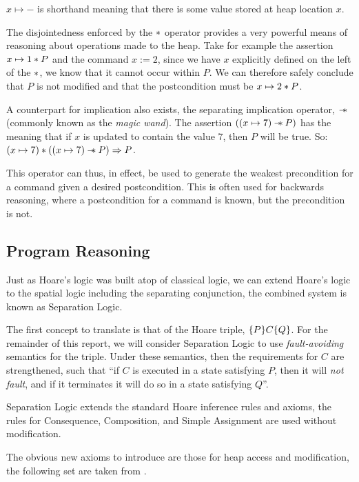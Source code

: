 \documentclass[a4paper,notitlepage]{report}
\begin{document}

  $x \mapsto -$ is shorthand meaning that there is some value stored at heap
  location $x$.

  The disjointedness enforced by the $\mathbin{*}$ operator provides a very powerful
  means of reasoning about operations made to the heap. Take for example the
  assertion $x \mapsto 1 \mathbin{*} P$ and the command $x := 2$, since we have $x$
  explicitly defined on the left of the $\mathbin{*}$, we know that it cannot occur
  within $P$. We can therefore safely conclude that $P$ is not modified and that
  the postcondition must be $x \mapsto 2 \mathbin{*} P$.

  A counterpart for implication also exists,
  the separating implication operator, $\mathbin{-\mkern-6mu *}$ (commonly known as the
  \emph{magic wand}). The assertion $((x
  \mapsto 7) \mathbin{-\mkern-6mu *} P)$ has the meaning that if $x$ is updated to contain the
  value $7$, then $P$ will be true. So: $(x \mapsto 7) \mathbin{*} ((x \mapsto 7) \mathbin{-\mkern-6mu *}
  P) \Rightarrow P$.

  This operator can thus, in effect, be
  used to generate the weakest precondition for a command given a desired
  postcondition. This is often used for backwards reasoning, where a
  postcondition for a command is known, but the precondition is not.

  \subsection{Program Reasoning}

  Just as Hoare's logic was built atop of classical logic, we can extend
  Hoare's logic to the spatial logic including the separating conjunction,
  the combined system is known as Separation Logic.

  The first concept to translate is that of the Hoare triple, $\{P\}C\{Q\}$.
  For the remainder of this report, we will consider Separation Logic to use
  \emph{fault-avoiding} semantics for the triple. Under these semantics, then the
  requirements for $C$ are strengthened, such that ``if $C$ is executed in a
  state satisfying $P$, then it will \emph{not fault}, and if it terminates it
  will do so in a state satisfying $Q$''.

  Separation Logic extends the standard Hoare inference rules and axioms, the
  rules for Consequence, Composition, and Simple Assignment are used without
  modification.

  The obvious new axioms to introduce are those for heap access and
  modification, the following set are taken from \cite{OHearn2001Local}.
\end{document}
